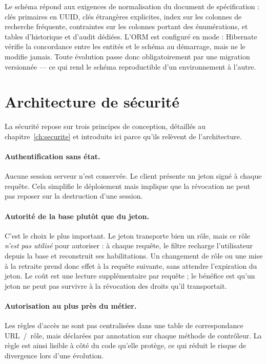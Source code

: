 Le schéma répond aux exigences de normalisation du document de spécification : clés
primaires en UUID, clés étrangères explicites, index sur les colonnes de recherche
fréquente, contraintes  sur les colonnes portant des énumérations, et tables
d'historique et d'audit dédiées. L'ORM est configuré en mode  : Hibernate
vérifie la concordance entre les entités et le schéma au démarrage, mais ne le modifie
jamais. Toute évolution passe donc obligatoirement par une migration versionnée --- ce qui
rend le schéma reproductible d'un environnement à l'autre.

\section{Architecture de sécurité}

La sécurité repose sur trois principes de conception, détaillés au
chapitre~\ref{ch:securite} et introduits ici parce qu'ils relèvent de l'architecture.

\paragraph{Authentification sans état.} Aucune session serveur n'est conservée. Le client
présente un jeton signé à chaque requête. Cela simplifie le déploiement mais implique que
la révocation ne peut pas reposer sur la destruction d'une session.

\paragraph{Autorité de la base plutôt que du jeton.} C'est le choix le plus important. Le
jeton transporte bien un rôle, mais ce rôle \emph{n'est pas utilisé} pour autoriser : à
chaque requête, le filtre recharge l'utilisateur depuis la base et reconstruit ses
habilitations. Un changement de rôle ou une mise à la retraite prend donc effet à la
requête suivante, sans attendre l'expiration du jeton. Le coût est une lecture
supplémentaire par requête ; le bénéfice est qu'un jeton ne peut pas survivre à la
révocation des droits qu'il transportait.

\paragraph{Autorisation au plus près du métier.} Les règles d'accès ne sont pas centralisées
dans une table de correspondance URL~/~rôle, mais déclarées par annotation sur chaque
méthode de contrôleur. La règle est ainsi lisible à côté du code qu'elle protège, ce qui
réduit le risque de divergence lors d'une évolution.
